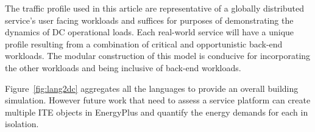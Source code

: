 The traffic profile used in this article are representative of a globally distributed service’s user facing workloads and suffices for purposes of demonstrating the dynamics of DC operational loads. Each real-world service will have a unique profile resulting from a combination of critical and opportunistic back-end workloads. The modular construction of this model is conducive for incorporating the other workloads and being inclusive of back-end workloads.

Figure~\ref{fig:lang2dc} aggregates all the languages to provide an overall building simulation. However future work that need to assess a service platform can create multiple ITE objects in EnergyPlus and quantify the energy demands for each in isolation.